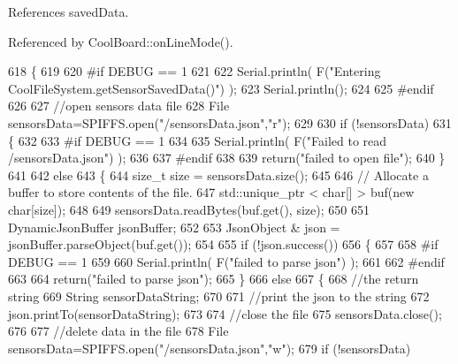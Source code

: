 References saved\+Data.



Referenced by Cool\+Board\+::on\+Line\+Mode().


\begin{DoxyCode}
618 \{
619 
620 \textcolor{preprocessor}{#if DEBUG == 1 }
621 
622     Serial.println( F(\textcolor{stringliteral}{"Entering CoolFileSystem.getSensorSavedData()"}) );
623     Serial.println();
624 
625 \textcolor{preprocessor}{#endif}
626 
627     \textcolor{comment}{//open sensors data file}
628     File sensorsData=SPIFFS.open(\textcolor{stringliteral}{"/sensorsData.json"},\textcolor{stringliteral}{"r"});
629     
630     \textcolor{keywordflow}{if} (!sensorsData)
631     \{
632 
633 \textcolor{preprocessor}{    #if DEBUG == 1 }
634 
635         Serial.println( F(\textcolor{stringliteral}{"Failed to read /sensorsData.json"}) );
636 
637 \textcolor{preprocessor}{    #endif}
638  
639         \textcolor{keywordflow}{return}(\textcolor{stringliteral}{"failed to open file"});
640     \}
641 
642     \textcolor{keywordflow}{else}
643     \{
644         \textcolor{keywordtype}{size\_t} size = sensorsData.size();
645 
646         \textcolor{comment}{// Allocate a buffer to store contents of the file.}
647         std::unique\_ptr < char[] > buf(\textcolor{keyword}{new} \textcolor{keywordtype}{char}[size]);
648 
649         sensorsData.readBytes(buf.get(), size);
650 
651         DynamicJsonBuffer jsonBuffer;
652 
653         JsonObject & json = jsonBuffer.parseObject(buf.get());
654         
655         \textcolor{keywordflow}{if} (!json.success())
656         \{
657 
658 \textcolor{preprocessor}{        #if DEBUG == 1}
659         
660             Serial.println( F(\textcolor{stringliteral}{"failed to parse json"}) );
661         
662 \textcolor{preprocessor}{        #endif}
663         
664             \textcolor{keywordflow}{return}(\textcolor{stringliteral}{"failed to parse json"});
665         \}
666         \textcolor{keywordflow}{else}
667         \{   
668             \textcolor{comment}{//the return string}
669             String sensorDataString;
670             
671             \textcolor{comment}{//print the json to the string}
672             json.printTo(sensorDataString);
673             
674             \textcolor{comment}{//close the file}
675             sensorsData.close();
676 
677             \textcolor{comment}{//delete data in the file}
678             File sensorsData=SPIFFS.open(\textcolor{stringliteral}{"/sensorsData.json"},\textcolor{stringliteral}{"w"});
679             \textcolor{keywordflow}{if} (!sensorsData)   

\end{DoxyCode}
